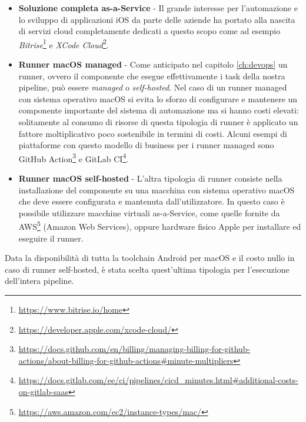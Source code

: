 \begin{itemize}
    \item \textbf{Soluzione completa as-a-Service} - Il grande interesse per l'automazione e lo sviluppo di applicazioni iOS da parte delle aziende ha portato alla nascita di servizi cloud completamente dedicati a questo scopo come ad esempio \textit{Bitrise}\footnote{\href{https://www.bitrise.io/home}{https://www.bitrise.io/home}} e \textit{XCode Cloud}\footnote{\href{https://developer.apple.com/xcode-cloud/}{https://developer.apple.com/xcode-cloud/}}.
    \item \textbf{Runner macOS managed} - Come anticipato nel capitolo \ref{ch:devops} un runner, ovvero il componente che esegue effettivamente i task della nostra pipeline, può essere \textit{managed} o \textit{self-hosted}. Nel caso di un runner managed con sistema operativo macOS si evita lo sforzo di configurare e mantenere un componente importante del sistema di automazione ma si hanno costi elevati: solitamente al consumo di risorse di questa tipologia di runner è applicato un fattore moltiplicativo poco sostenibile in termini di costi. Alcuni esempi di piattaforme con questo modello di business per i runner managed sono GitHub Action\footnote{\href{https://docs.github.com/en/billing/managing-billing-for-github-actions/about-billing-for-github-actions\#minute-multipliers}{https://docs.github.com/en/billing/managing-billing-for-github-actions/about-billing-for-github-actions\#minute-multipliers}} e GitLab CI\footnote{\href{https://docs.gitlab.com/ee/ci/pipelines/cicd\_minutes.html\#additional-costs-on-gitlab-saas}{https://docs.gitlab.com/ee/ci/pipelines/cicd\_minutes.html\#additional-costs-on-gitlab-saas}}.
    \item \textbf{Runner macOS self-hosted} - L'altra tipologia di runner consiste nella installazione del componente su una macchina con sistema operativo macOS che deve essere configurata e mantenuta dall'utilizzatore. In questo caso è possibile utilizzare macchine virtuali as-a-Service, come quelle fornite da AWS\footnote{\href{https://aws.amazon.com/ec2/instance-types/mac/}{https://aws.amazon.com/ec2/instance-types/mac/}} (Amazon Web Services), oppure hardware fisico Apple per installare ed eseguire il runner.
\end{itemize}

Data la disponibilità di tutta la toolchain Android per macOS e il costo nullo in caso di runner self-hosted, è stata scelta quest'ultima tipologia per l'esecuzione dell'intera pipeline.

